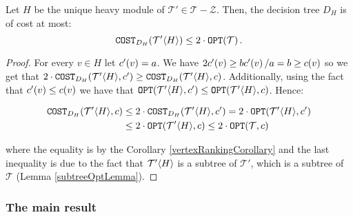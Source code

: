\begin{lemma}\label{heavygroupcostlemma}
    Let $H$ be the unique heavy module of $\mathcal{T}'\in \mathcal{T}-\mathcal{Z}$. Then, the decision tree $D_H$ is of cost at most:
    $$\COST_{D_H}\br{\mathcal{T}'\angl{H}}\leq 2\cdot\OPT\br{\mathcal{T}}.$$
    \begin{proof}
        
    For every $v\in H$ let $c'\br{v}=a$. We have $2 c'\br{v}\geq b c'\br{v}/a =  b \geq c\br{v}$ so we get that $2\cdot\COST_{D_H}\br{\mathcal{T}'\angl{H}, c'}\geq \COST_{D_H}\br{\mathcal{T}'\angl{H}, c}$. Additionally, using the fact that $c'\br{v} \leq c\br{v}$ we have that $\OPT\br{\mathcal{T}'\angl{H}, c'}\leq \OPT\br{\mathcal{T}'\angl{H}, c}$. Hence:
    
    \begin{align*}
        \COST_{D_H}\br{\mathcal{T}'\angl{H}, c}&\leq 2\cdot\COST_{D_H}\br{\mathcal{T}'\angl{H}, c'}=2\cdot\OPT\br{\mathcal{T}'\angl{H}, c'} \\
        &\leq
        2\cdot\OPT\br{\mathcal{T}'\angl{H}, c}\leq 2\cdot\OPT\br{\mathcal{T}, c}
    \end{align*}
    
        
    where the equality is by the Corollary \ref{vertexRankingCorollary} and the last inequality is due to the fact that $\mathcal{T}'\angl{H}$ is a subtree of $\mathcal{T}'$, which is a subtree of $\mathcal{T}$ (Lemma \ref{subtreeOptLemma}).
    \end{proof}
\end{lemma}

\subsubsection{The main result}

